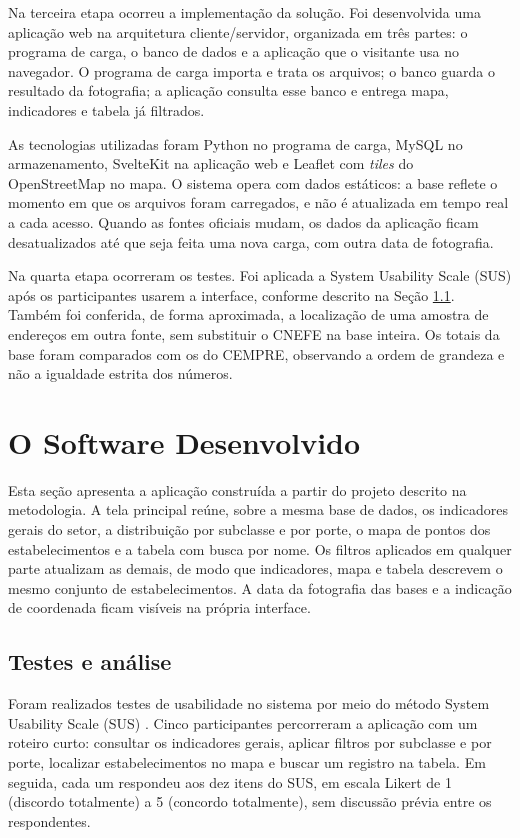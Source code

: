 \documentclass[a4paper,12pt]{article}
\begin{document}
Na terceira etapa ocorreu a implementação da solução.
Foi desenvolvida uma aplicação web na arquitetura cliente/servidor, organizada em três partes: o programa de carga, o banco de dados e a aplicação que o visitante usa no navegador.
O programa de carga importa e trata os arquivos; o banco guarda o resultado da fotografia; a aplicação consulta esse banco e entrega mapa, indicadores e tabela já filtrados.

As tecnologias utilizadas foram Python no programa de carga, MySQL no armazenamento, SvelteKit na aplicação web e Leaflet com \textit{tiles} do OpenStreetMap no mapa.
O sistema opera com dados estáticos: a base reflete o momento em que os arquivos foram carregados, e não é atualizada em tempo real a cada acesso.
Quando as fontes oficiais mudam, os dados da aplicação ficam desatualizados até que seja feita uma nova carga, com outra data de fotografia.

Na quarta etapa ocorreram os testes.
Foi aplicada a System Usability Scale (SUS) após os participantes usarem a interface, conforme descrito na Seção \ref{subsec:testes}.
Também foi conferida, de forma aproximada, a localização de uma amostra de endereços em outra fonte, sem substituir o CNEFE na base inteira.
Os totais da base foram comparados com os do CEMPRE, observando a ordem de grandeza e não a igualdade estrita dos números.

\section{O Software Desenvolvido}

Esta seção apresenta a aplicação construída a partir do projeto descrito na metodologia.
A tela principal reúne, sobre a mesma base de dados, os indicadores gerais do setor, a distribuição por subclasse e por porte, o mapa de pontos dos estabelecimentos e a tabela com busca por nome.
Os filtros aplicados em qualquer parte atualizam as demais, de modo que indicadores, mapa e tabela descrevem o mesmo conjunto de estabelecimentos.
A data da fotografia das bases e a indicação de coordenada ficam visíveis na própria interface.


\subsection{Testes e análise}
\label{subsec:testes}

Foram realizados testes de usabilidade no sistema por meio do método System Usability Scale (SUS) \cite{brooke1996}.
Cinco participantes percorreram a aplicação com um roteiro curto: consultar os indicadores gerais, aplicar filtros por subclasse e por porte, localizar estabelecimentos no mapa e buscar um registro na tabela.
Em seguida, cada um respondeu aos dez itens do SUS, em escala Likert de 1 (discordo totalmente) a 5 (concordo totalmente), sem discussão prévia entre os respondentes.
\end{document}
